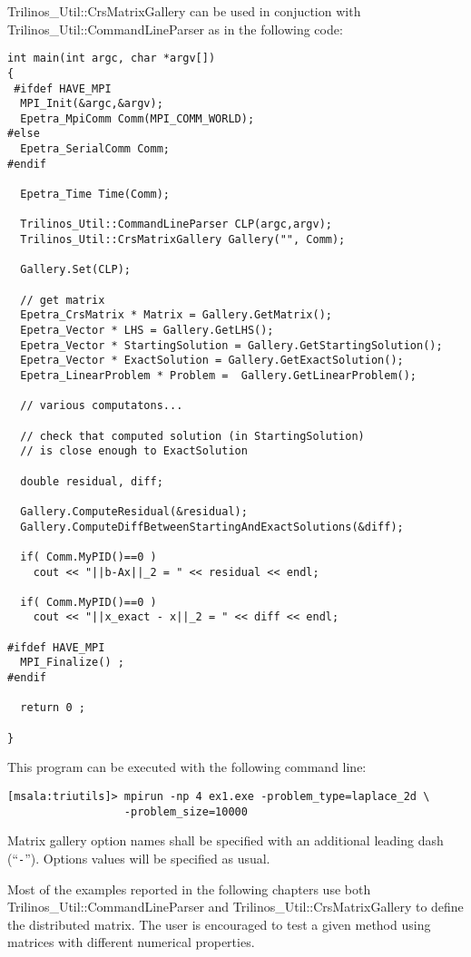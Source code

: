 Trilinos\_Util::CrsMatrixGallery can be used in conjuction with
Trilinos\_Util::CommandLineParser as in the following code:
\begin{verbatim}
int main(int argc, char *argv[]) 
{
 #ifdef HAVE_MPI
  MPI_Init(&argc,&argv);
  Epetra_MpiComm Comm(MPI_COMM_WORLD);
#else
  Epetra_SerialComm Comm;
#endif

  Epetra_Time Time(Comm);

  Trilinos_Util::CommandLineParser CLP(argc,argv);
  Trilinos_Util::CrsMatrixGallery Gallery("", Comm);

  Gallery.Set(CLP);

  // get matrix
  Epetra_CrsMatrix * Matrix = Gallery.GetMatrix();
  Epetra_Vector * LHS = Gallery.GetLHS();
  Epetra_Vector * StartingSolution = Gallery.GetStartingSolution();
  Epetra_Vector * ExactSolution = Gallery.GetExactSolution();
  Epetra_LinearProblem * Problem =  Gallery.GetLinearProblem();

  // various computatons...

  // check that computed solution (in StartingSolution) 
  // is close enough to ExactSolution

  double residual, diff;

  Gallery.ComputeResidual(&residual);
  Gallery.ComputeDiffBetweenStartingAndExactSolutions(&diff);
  
  if( Comm.MyPID()==0 ) 
    cout << "||b-Ax||_2 = " << residual << endl;

  if( Comm.MyPID()==0 ) 
    cout << "||x_exact - x||_2 = " << diff << endl;

#ifdef HAVE_MPI
  MPI_Finalize() ;
#endif

  return 0 ;

}
\end{verbatim}
This program can be executed with the following command line:
\begin{verbatim}
[msala:triutils]> mpirun -np 4 ex1.exe -problem_type=laplace_2d \
                  -problem_size=10000
\end{verbatim}
Matrix gallery option names shall be specified with an additional
leading dash (``\verb!-!''). Options values will be specified as usual.

\begin{remark}
  Most of the examples reported in the following chapters use both\newline
  Trilinos\_Util::CommandLineParser and Trilinos\_Util::CrsMatrixGallery
  to define the distributed matrix. The user is encouraged to test a
  given method using matrices with different numerical properties.
\end{remark}

